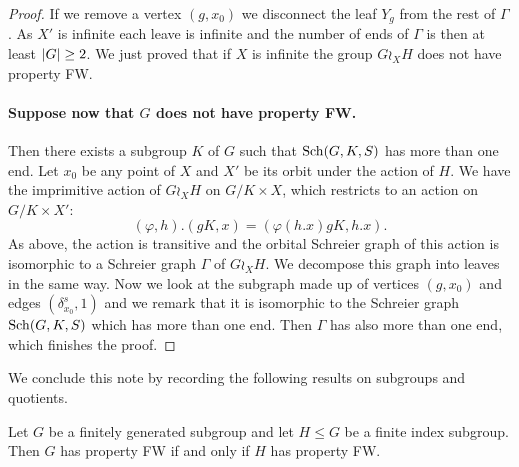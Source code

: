 \begin{proof}
If we remove a vertex $(g,x_0)$ we disconnect the leaf $Y_g$ from the rest of $\Gamma$. As $X'$ is infinite each leave is infinite and the number of ends of $\Gamma$ is then at least $\lvert G\rvert\geq 2$. We just proved that if $X$ is infinite the group $G\wr_XH$ does not have property FW.
%
%
%
\paragraph{Suppose now that $G$ does not have property FW.} Then there exists a subgroup $K$ of $G$ such that $\operatorname{Sch}(G,K,S)$ has more than one end.
Let $x_0$ be any point of $X$ and $X'$ be its orbit under the action of $H$.
We have the imprimitive action of $G\wr_XH$ on $G/K\times X$, which restricts to an action on $G/K\times X'$:
\[
	(\varphi,h).(gK,x) = (\varphi(h.x) gK, h.x).
\]
As above, the action is transitive and the orbital Schreier graph of this action is isomorphic to a Schreier graph $\Gamma$ of $G\wr_XH$. We decompose this graph into leaves in the same way. Now we look at the subgraph made up of vertices $(g,x_0)$ and edges $(\delta_{x_0}^s,1)$ and we remark that it is isomorphic to the Schreier graph $\operatorname{Sch}(G,K,S)$ which has more than one end. Then $\Gamma$ has also more than one end, which finishes the proof.
\end{proof}
%
%
We conclude this note by recording the following results on subgroups and quotients.

\begin{lem}
Let $G$ be a finitely generated subgroup and let $H\leq G$ be a finite index subgroup. Then $G$ has property FW if and only if $H$ has property FW.
\end{lem}

